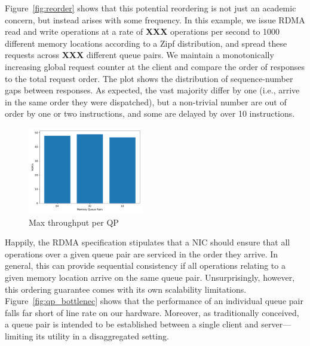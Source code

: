 Figure~\ref{fig:reorder} shows that this potential reordering is not
just an academic concern, but instead arises with some frequency.  In
this example, we issue RDMA read and write operations at a rate of
\textbf{XXX} operations per second to 1000 different memory
locations according to a Zipf distribution, and spread these requests
across \textbf{XXX} different queue pairs.  We maintain a monotonically
increasing global request counter at the client and compare the order
of responses to the total request order.  The plot shows the
distribution of sequence-number gaps between responses.  As expected,
the vast majority differ by one (i.e., arrive in the same order they
were dispatched), but a non-trivial number are out of order by one or
two instructions, and some are delayed by over 10 instructions.


\begin{figure}[t]
    \includegraphics[width=0.45\textwidth]{fig/qp_bottleneck.pdf}
    \caption{Max throughput per QP }
    \label{fig:qp_bottleneck}
\end{figure}

Happily, the RDMA specification stipulates that a NIC should ensure
that all operations over a given queue pair are serviced in the order
they arrive.  In general, this can provide sequential consistency if
all operations relating to a given memory location arrive on the same
queue pair.  Unsurprisingly, however, this ordering guarantee comes
with its own scalability limitations.  Figure~\ref{fig:qp_bottlenec}
shows that the performance of an individual queue pair falls far short
of line rate on our hardware.  Moreover, as traditionally conceived, a
queue pair is intended to be established between a single client and
server---limiting its utility in a disaggregated setting.

